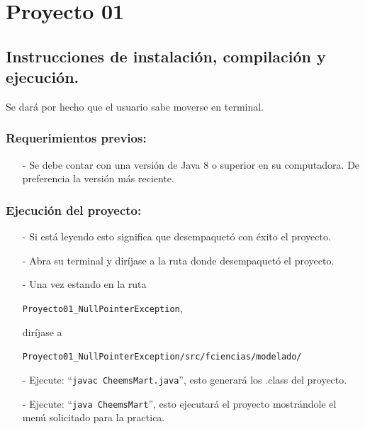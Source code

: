 \documentclass{article}
\newcommand{\code}[1]{\textcolor{white!25!black}{\texttt{#1}}}
\begin{document}

\section*{\LARGE{Proyecto 01}}

\subsection*{Instrucciones de instalación, compilación y ejecución.}
Se dará por hecho que el usuario sabe moverse en terminal.
\subsubsection*{Requerimientos previos:}
\begin{itemize}
\item[-] Se debe contar con una versión de Java $8$ o superior en su computadora. De preferencia la versión más reciente.
\end{itemize}

\subsubsection*{Ejecución del proyecto:}
\begin{itemize}
\item[-] Si está leyendo esto significa que desempaquetó con éxito el proyecto.
\item[-] Abra su terminal y diríjase a la ruta donde desempaquetó el proyecto.
\item[-] Una vez estando en la ruta
  
  \code{Proyecto01\_NullPointerException},
  
  diríjase a

  \code{Proyecto01\_NullPointerException/src/fciencias/modelado/}
\item[-] Ejecute: “\code{javac CheemsMart.java}”, esto generará los .class del proyecto.
\item[-] Ejecute: “\code{java CheemsMart}”, esto ejecutará el proyecto mostrándole el menú solicitado para la practica.
\end{itemize}
\end{document}

